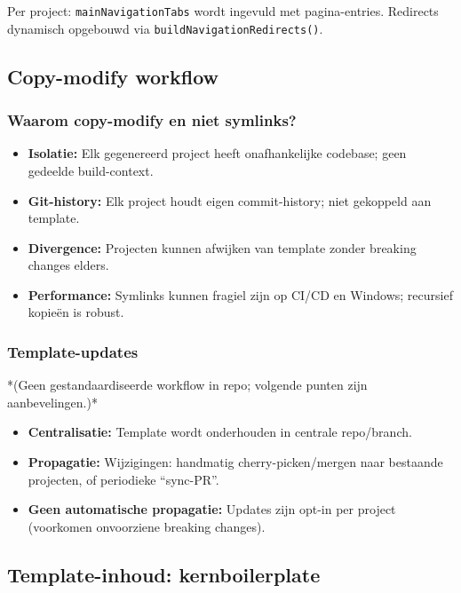 \noindent
Per project: \texttt{mainNavigationTabs} wordt ingevuld met pagina-entries. Redirects dynamisch opgebouwd via \texttt{buildNavigationRedirects()}.

\subsection{Copy-modify workflow}

\subsubsection{Waarom copy-modify en niet symlinks?}

\begin{itemize}
  \item \textbf{Isolatie:} Elk gegenereerd project heeft onafhankelijke codebase; geen gedeelde build-context.
  \item \textbf{Git-history:} Elk project houdt eigen commit-history; niet gekoppeld aan template.
  \item \textbf{Divergence:} Projecten kunnen afwijken van template zonder breaking changes elders.
  \item \textbf{Performance:} Symlinks kunnen fragiel zijn op CI/CD en Windows; recursief kopieën is robust.
\end{itemize}

\subsubsection{Template-updates}

*(Geen gestandaardiseerde workflow in repo; volgende punten zijn aanbevelingen.)*

\begin{itemize}
  \item \textbf{Centralisatie:} Template wordt onderhouden in centrale repo/branch.
  \item \textbf{Propagatie:} Wijzigingen: handmatig cherry-picken/mergen naar bestaande projecten, of periodieke ``sync-PR''.
  \item \textbf{Geen automatische propagatie:} Updates zijn opt-in per project (voorkomen onvoorziene breaking changes).
\end{itemize}

\subsection{Template-inhoud: kernboilerplate}

